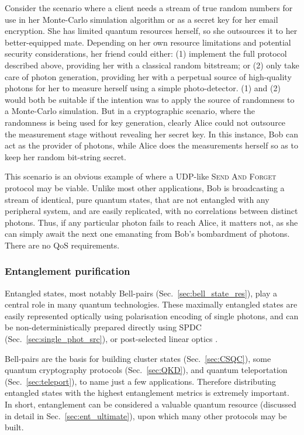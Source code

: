 \documentclass[aps,rmp,twocolumn,amsmath,amssymb,nofootinbib,superscriptaddress,longbibliography,floatfix,table-of-contents,eqsecnum]{revtex4-1}
\begin{document}
Consider the scenario where a client needs a stream of true random numbers for use in her Monte-Carlo simulation algorithm or as a secret key for her email encryption. She has limited quantum resources herself, so she outsources it to her better-equipped mate. Depending on her own resource limitations and potential security considerations, her friend could either: (1) implement the full protocol described above, providing her with a classical random bitstream; or (2) only take care of photon generation, providing her with a perpetual source of high-quality photons for her to measure herself using a simple photo-detector. (1) and (2) would both be suitable if the intention was to apply the source of randomness to a Monte-Carlo simulation. But in a cryptographic scenario, where the randomness is being used for key generation, clearly Alice could not outsource the measurement stage without revealing her secret key. In this instance, Bob can act as the provider of photons, while Alice does the measurements herself so as to keep her random bit-string secret.

This scenario is an obvious example of where a UDP-like \textsc{Send And Forget} protocol may be viable. Unlike most other applications, Bob is broadcasting a stream of identical, pure quantum states, that are not entangled with any peripheral system, and are easily replicated, with no correlations between distinct photons. Thus, if any particular photon fails to reach Alice, it matters not, as she can simply await the next one emanating from Bob's bombardment of photons. There are no QoS requirements.

%
%

\subsubsection{Entanglement purification} \label{sec:ent_purif} 

Entangled states, most notably Bell-pairs (Sec.~\ref{sec:bell_state_res}), play a central role in many quantum technologies. These maximally entangled states are easily represented optically using polarisation encoding of single photons, and can be non-deterministically prepared directly using SPDC (Sec.~\ref{sec:single_phot_src}), or post-selected linear optics \cite{???}.

Bell-pairs are the basis for building cluster states (Sec.~\ref{sec:CSQC}), some quantum cryptography protocols (Sec.~\ref{sec:QKD}), and quantum teleportation (Sec.~\ref{sec:teleport}), to name just a few applications. Therefore distributing entangled states with the highest entanglement metrics is extremely important. In short, entanglement can be considered a valuable quantum resource (discussed in detail in Sec.~\ref{sec:ent_ultimate}), upon which many other protocols may be built.
\end{document}
